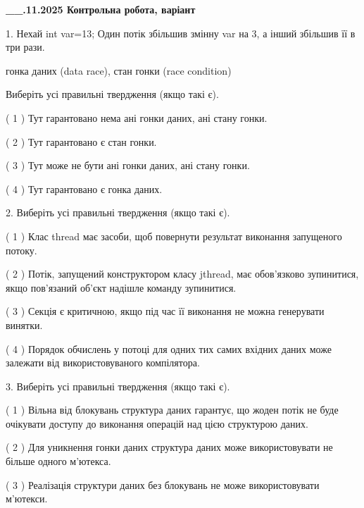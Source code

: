 \documentclass[12pt, ukrainian]{article}
\begin{document}
\newpage
\begin {large}

\textbf{\_\_.11.2025 Контрольна робота, варіант  }\par


{
1. Нехай int var=13; Один потік збільшив змінну var на 3, а інший збільшив її в три рази.

гонка даних (data race), стан гонки (race condition)

Виберіть усі правильні твердження (якщо такі є).\par
\vspace{2mm}
( 1 ) Тут гарантовано нема ані гонки даних, ані стану гонки.%

( 2 ) Тут гарантовано є стан гонки.%

( 3 ) Тут може не бути ані гонки даних, ані стану гонки.%

( 4 ) Тут гарантовано є гонка даних.%


2. Виберіть усі правильні твердження (якщо такі є).\par
\vspace{2mm}

( 1 ) Клас thread має засоби, щоб повернути результат виконання запущеного потоку.%

( 2 ) Потік, запущений конструктором класу jthread, має обов’язково зупинитися, якщо пов’язаний об’єкт надішле команду зупинитися.%

( 3 ) Секція є критичною, якщо під час її виконання не можна генерувати винятки.%

( 4 ) Порядок обчислень у потоці для одних тих самих вхідних даних може залежати від використовуваного компілятора.%


3. Виберіть усі правильні твердження (якщо такі є).\par
\vspace{2mm}

( 1 ) Вільна від блокувань структура даних гарантує, що жоден потік не буде очікувати доступу до виконання операцій над цією структурою даних.%

( 2 ) Для уникнення гонки даних структура даних може використовувати не більше одного м’ютекса.%

( 3 ) Реалізація структури даних без блокувань не може використовувати м’ютекси.%

}
\end{large}
\end{document}
